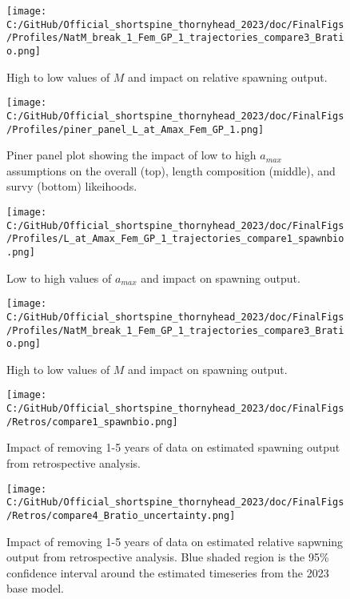 \documentclass[11pt,
  english,
  letterpaper,
]{article}
\begin{document}
\begin{figure}
\centering
\texttt{[image: C:/GitHub/Official\_shortspine\_thornyhead\_2023/doc/FinalFigs/Profiles/NatM\_break\_1\_Fem\_GP\_1\_trajectories\_compare3\_Bratio.png]}
\caption{High to low values of \(M\) and impact on relative spawning output.\label{fig:M_relspawnout}}
\end{figure}

\begin{figure}
\centering
\texttt{[image: C:/GitHub/Official\_shortspine\_thornyhead\_2023/doc/FinalFigs/Profiles/piner\_panel\_L\_at\_Amax\_Fem\_GP\_1.png]}
\caption{Piner panel plot showing the impact of low to high \(a_{max}\) assumptions on the overall (top), length composition (middle), and survy (bottom) likeihoods.\label{fig:growth_prof}}
\end{figure}

\begin{figure}
\centering
\texttt{[image: C:/GitHub/Official\_shortspine\_thornyhead\_2023/doc/FinalFigs/Profiles/L\_at\_Amax\_Fem\_GP\_1\_trajectories\_compare1\_spawnbio.png]}
\caption{Low to high values of \(a_{max}\) and impact on spawning output.\label{fig:growth_spawnout}}
\end{figure}

\begin{figure}
\centering
\texttt{[image: C:/GitHub/Official\_shortspine\_thornyhead\_2023/doc/FinalFigs/Profiles/NatM\_break\_1\_Fem\_GP\_1\_trajectories\_compare3\_Bratio.png]}
\caption{High to low values of \(M\) and impact on spawning output.\label{fig:M_spawnout}}
\end{figure}

\clearpage

\begin{figure}
\centering
\texttt{[image: C:/GitHub/Official\_shortspine\_thornyhead\_2023/doc/FinalFigs/Retros/compare1\_spawnbio.png]}
\caption{Impact of removing 1-5 years of data on estimated spawning output from retrospective analysis.\label{fig:retros_spawnbio}}
\end{figure}

\begin{figure}
\centering
\texttt{[image: C:/GitHub/Official\_shortspine\_thornyhead\_2023/doc/FinalFigs/Retros/compare4\_Bratio\_uncertainty.png]}
\caption{Impact of removing 1-5 years of data on estimated relative sapwning output from retrospective analysis. Blue shaded region is the 95\% confidence interval around the estimated timeseries from the 2023 base model.\label{fig:retros_bratio_uncertainty}}
\end{figure}
\end{document}
